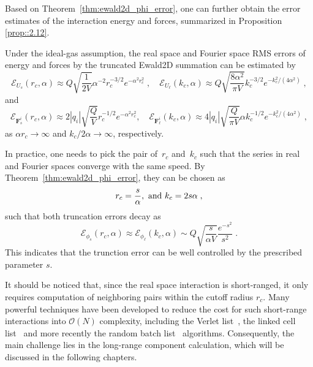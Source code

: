 Based on Theorem~\ref{thm:ewald2d_phi_error}, one can further obtain the error estimates of the interaction energy and forces, summarized in Proposition \ref{prop::2.12}.

\begin{prop}\label{prop::2.12}
	Under the ideal-gas assumption, the real space and Fourier space RMS errors of energy and forces by the truncated Ewald2D summation can be estimated by
	\begin{equation}\label{thm:ewald2d_error}
		\mathscr{E}_{U_s} (r_c, \alpha) \approx Q \sqrt{\frac{1}{2 V}} \alpha^{-2} r_c^{-3/2} e^{-\alpha^2r_c^2}\;,\quad
		\mathscr{E}_{U_{\ell}} (k_c, \alpha) \approx Q \sqrt{\frac{8 \alpha^2}{\pi V}} k_c^{-3/2} e^{- k_c^2/(4 \alpha^2)}\;,
	\end{equation}
	and
	\begin{equation}
		\mathscr{E}_{\bm{F}_{s}^i} (r_c, \alpha)\approx 2|q_{i}|\sqrt{\frac{Q}{V}}r_c^{-1/2}e^{-\alpha^2 r_c^2},\quad \mathscr{E}_{\bm{F}_{\ell}^i} (k_c, \alpha)\approx 4|q_{i}|\sqrt{\frac{Q}{\pi V}}\alpha k_c^{-1/2}e^{-k_c^2/(4\alpha^2)}\;,
	\end{equation}
	as $\alpha r_c\rightarrow\infty$ and $k_c/2\alpha\rightarrow\infty$, respectively.
\end{prop}

\begin{rmk}
	In practice, one needs to pick the pair of~$r_c$ and~$k_c$
	such that the series in real and Fourier spaces converge with the same speed.
	By Theorem~\ref{thm:ewald2d_phi_error}, they can be chosen as
	\begin{equation}\label{eq::rckc}
		r_c = \frac{s}{\alpha},~\hbox{and}~k_c = 2 s \alpha\;,
	\end{equation}
	such that both truncation errors decay as 
	\begin{equation}\label{eq:trunction_error}
		\mathscr{E}_{\phi_s}(r_c, \alpha)\approx \mathscr{E}_{\phi_\ell}(k_c, \alpha) \sim Q 
		\sqrt{\frac{s}{\alpha V}} \frac{e^{-s^2}}{s^2}\;.
	\end{equation}
	This indicates that the trunction error can be well controlled by the prescribed parameter $s$. 
\end{rmk}

It should be noticed that, since the real space interaction is short-ranged, it only requires computation of neighboring pairs within the cutoff radius $r_c$. 
Many powerful techniques have been developed to reduce the cost for such short-range interactions into $\mathcal O(N)$ complexity, including the Verlet list~\cite{verlet1967computer}, the linked cell list~\cite{allen2017computer} and more recently the random batch list~\cite{liang2021random} algorithms. 
Consequently, the main challenge lies in the long-range component calculation, which will be discussed in the following chapters.

